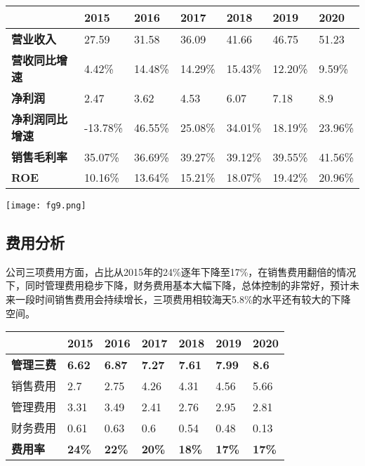 \documentclass[UTF8,a4paper,zihao=-4,fontset = windows]{ctexart} %
\begin{document}
{
\centering       %
    \begin{tabular}{lllllll}
                     & \textbf{2015} & \textbf{2016} & \textbf{2017} & \textbf{2018} & \textbf{2019} & \textbf{2020} \\
                     \hline
    \textbf{营业收入}    & 27.59         & 31.58         & 36.09         & 41.66         & 46.75         & 51.23         \\
    \hline
    \textbf{营收同比增速}  & 4.42\%        & 14.48\%       & 14.29\%       & 15.43\%       & 12.20\%       & 9.59\%        \\
    \hline
    \textbf{净利润}     & 2.47          & 3.62          & 4.53          & 6.07          & 7.18          & 8.9           \\
    \hline
    \textbf{净利润同比增速} & -13.78\%      & 46.55\%       & 25.08\%       & 34.01\%       & 18.19\%       & 23.96\%       \\
    \hline
    \textbf{销售毛利率}   & 35.07\%       & 36.69\%       & 39.27\%       & 39.12\%       & 39.55\%       & 41.56\%       \\
    \hline
    \textbf{ROE}     & 10.16\%       & 13.64\%       & 15.21\%       & 18.07\%       & 19.42\%       & 20.96\%   \\
    \hline   
    \end{tabular}
    }

\texttt{[image: fg9.png]} 

\subsection{费用分析}
公司三项费用方面，占比从2015年的24\%逐年下降至17\%，在销售费用翻倍的情况下，同时管理费用稳步下降，财务费用基本大幅下降，总体控制的非常好，预计未来一段时间销售费用会持续增长，三项费用相较海天5.8\%的水平还有较大的下降空间。

\begin{tabular}{lllllll}
    \textbf{}                & \textbf{2015} & \textbf{2016} & \textbf{2017} & \textbf{2018} & \textbf{2019} & \textbf{2020} \\
    \hline
    \textbf{管理三费}            & \textbf{6.62} & \textbf{6.87} & \textbf{7.27} & \textbf{7.61} & \textbf{7.99} & \textbf{8.6}  \\
    \hline
    \multicolumn{1}{r}{销售费用} & 2.7           & 2.75          & 4.26          & 4.31          & 4.56          & 5.66          \\
    \multicolumn{1}{r}{管理费用} & 3.31          & 3.49          & 2.41          & 2.76          & 2.95          & 2.81          \\
    \multicolumn{1}{r}{财务费用} & 0.61          & 0.63          & 0.6           & 0.54          & 0.48          & 0.13          \\
    \hline
    \textbf{费用率}             & \textbf{24\%}          & \textbf{22\%}          & \textbf{20\%}          & \textbf{18\%}          & \textbf{17\%}          & \textbf{17\%}         \\
    \hline
    \end{tabular}
\end{document}
